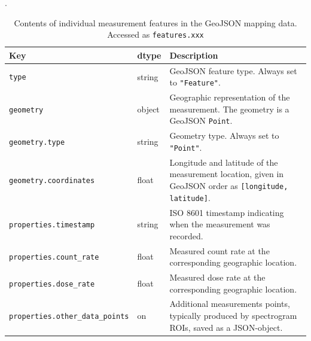 \begin{table}[H]
\centering
\caption{Contents of individual measurement features in the GeoJSON mapping data. Accessed as \texttt{features.xxx}}.
\label{tab:geojson_mapping_feature_schema}
\begin{tabular}{llp{7.3cm}}
\toprule
\textbf{Key} & \textbf{dtype} & \textbf{Description} \\ \midrule

\texttt{type} &
  string &
  GeoJSON feature type. Always set to \texttt{"Feature"}. \\

\texttt{geometry} &
  object &
  Geographic representation of the measurement. The geometry is a GeoJSON \texttt{Point}. \\

\texttt{geometry.type} &
  string &
  Geometry type. Always set to \texttt{"Point"}. \\

\texttt{geometry.coordinates} &
  float &
  Longitude and latitude of the measurement location, given in GeoJSON order as \texttt{[longitude, latitude]}. \\

\texttt{properties.timestamp} &
  string &
  ISO 8601 timestamp indicating when the measurement was recorded. \\

\texttt{properties.count\_rate} &
  float &
  Measured count rate at the corresponding geographic location. \\

\texttt{properties.dose\_rate} &
  float &
  Measured dose rate at the corresponding geographic location. \\

\texttt{properties.other\_data\_points} &
  on &
  Additional measurements points, typically produced by spectrogram ROIs, saved as a JSON-object. \\

\bottomrule
\end{tabular}
\end{table}
